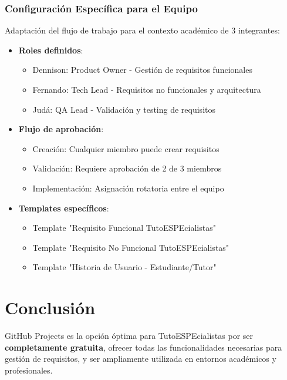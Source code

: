\documentclass[12pt,a4paper]{article}
\begin{document}
\subsubsection{Configuración Específica para el Equipo}

Adaptación del flujo de trabajo para el contexto académico de 3 integrantes:

\begin{itemize}
    \item \textbf{Roles definidos}:
    \begin{itemize}
        \item Dennison: Product Owner - Gestión de requisitos funcionales
        \item Fernando: Tech Lead - Requisitos no funcionales y arquitectura
        \item Judá: QA Lead - Validación y testing de requisitos
    \end{itemize}
    \item \textbf{Flujo de aprobación}:
    \begin{itemize}
        \item Creación: Cualquier miembro puede crear requisitos
        \item Validación: Requiere aprobación de 2 de 3 miembros
        \item Implementación: Asignación rotatoria entre el equipo
    \end{itemize}
    \item \textbf{Templates específicos}:
    \begin{itemize}
        \item Template "Requisito Funcional TutoESPEcialistas"
        \item Template "Requisito No Funcional TutoESPEcialistas"
        \item Template "Historia de Usuario - Estudiante/Tutor"
    \end{itemize}
\end{itemize}

\section{Conclusión}

\begin{tcolorbox}[colback=lightblue!15, colframe=headercolor, rounded corners, boxrule=2pt, title=Decisión Final]
GitHub Projects es la opción óptima para TutoESPEcialistas por ser \textbf{completamente gratuita}, ofrecer todas las funcionalidades necesarias para gestión de requisitos, y ser ampliamente utilizada en entornos académicos y profesionales.
\end{tcolorbox}
\end{document}
